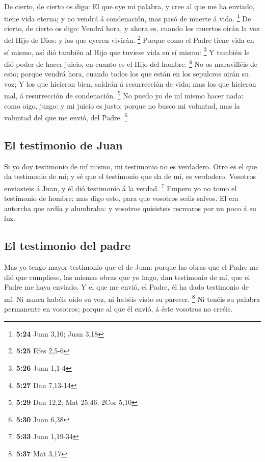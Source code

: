  De cierto, de cierto os digo: El que oye mi palabra, y
cree al que me ha enviado, tiene vida eterna; y no vendrá á condenación,
mas pasó de muerte á vida. \footnote{\textbf{5:24} Juan 3,16; Juan 3,18}
 De cierto, de cierto os digo: Vendrá hora, y ahora es,
cuando los muertos oirán la voz del Hijo de Dios: y los que oyeren
vivirán. \footnote{\textbf{5:25} Efes 2,5-6}  Porque como
el Padre tiene vida en sí mismo, así dió también al Hijo que tuviese
vida en sí mismo: \footnote{\textbf{5:26} Juan 1,1-4}  Y
también le dió poder de hacer juicio, en cuanto es el Hijo del hombre.
\footnote{\textbf{5:27} Dan 7,13-14}  No os maravilléis
de esto; porque vendrá hora, cuando todos los que están en los sepulcros
oirán su voz;  Y los que hicieron bien, saldrán á
resurrección de vida; mas los que hicieron mal, á resurrección de
condenación. \footnote{\textbf{5:29} Dan 12,2; Mat 25,46; 2Cor 5,10}
 No puedo yo de mí mismo hacer nada: como oigo, juzgo: y
mi juicio es justo; porque no busco mi voluntad, mas la voluntad del que
me envió, del Padre. \footnote{\textbf{5:30} Juan 6,38}

\hypertarget{el-testimonio-de-juan}{%
\subsection{El testimonio de Juan}\label{el-testimonio-de-juan}}

 Si yo doy testimonio de mí mismo, mi testimonio no es
verdadero.  Otro es el que da testimonio de mí; y sé que
el testimonio que da de mí, es verdadero.  Vosotros
enviasteis á Juan, y él dió testimonio á la verdad. \footnote{\textbf{5:33}
  Juan 1,19-34}  Empero yo no tomo el testimonio de
hombre; mas digo esto, para que vosotros seáis salvos. 
El era antorcha que ardía y alumbraba: y vosotros quisisteis recrearos
por un poco á su luz.

\hypertarget{el-testimonio-del-padre}{%
\subsection{El testimonio del padre}\label{el-testimonio-del-padre}}

 Mas yo tengo mayor testimonio que el de Juan: porque las
obras que el Padre me dió que cumpliese, las mismas obras que yo hago,
dan testimonio de mí, que el Padre me haya enviado.  Y el
que me envió, el Padre, él ha dado testimonio de mí. Ni nunca habéis
oído su voz, ni habéis visto su parecer. \footnote{\textbf{5:37} Mat
  3,17}  Ni tenéis su palabra permanente en vosotros;
porque al que él envió, á éste vosotros no creéis.

